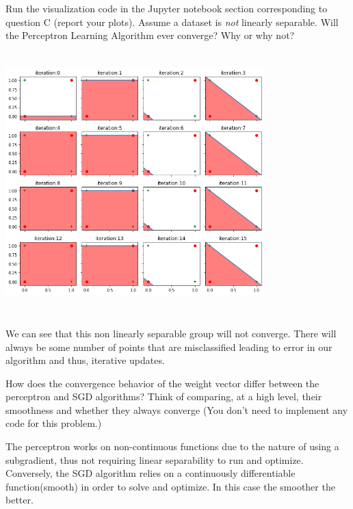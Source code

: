 \begin{problem}[2]
  Run the visualization code in the Jupyter notebook section corresponding to question C (report your plots). Assume a dataset is \emph{not} linearly separable. Will the Perceptron Learning Algorithm ever converge? Why or why not?
\end{problem}
\begin{solution}
\includegraphics[width=10cm, height=10cm]{set1/images/Unknown-15.png}\\
\\
We can see that this non linearly separable group will not converge. There will always be some number of points that are misclassified leading to error in our algorithm and thus, iterative updates.
\end{solution}

\begin{problem}[2]
How does the convergence behavior of the weight vector differ between the perceptron and SGD algorithms? Think of comparing, at a high level, their smoothness and whether they always converge (You don't need to implement any code for this problem.)
\end{problem}
\begin{solution}
The perceptron works on non-continuous functions due to the nature of using a subgradient, thus not requiring linear separability to run and optimize. Conversely, the SGD algorithm relies on a continuously differentiable function(smooth) in order to solve and optimize. In this case the smoother the better.
\end{solution}

